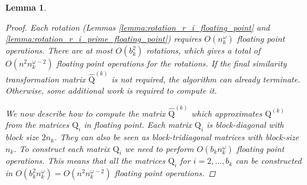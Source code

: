 \documentclass{article}
\newtheorem{lemma}{Lemma}[section]
\newcommand\matQ{\boldsymbol{\mathrm{Q}}}
\newcommand\matQhat{\widehat{\boldsymbol{\mathrm{Q}}}}
\begin{document}
\begin{lemma}
\begin{proof}
        Each rotation (Lemmas \ref{lemma:rotation_r_i_floating_point} and \ref{lemma:rotation_r_i_prime_floating_point}) requires $O(n_k^{\omega})$ floating point operations. There are at most $O(b_k^2)$ rotations, which gives a total of $O(n^2n_k^{\omega-2})$ floating point operations for the rotations. If the final similarity transformation matrix $\matQhat^{(k)}$ is not required, the algorithm can already terminate. Otherwise, some additional work is required to compute it.
        
        We now describe how to compute the matrix $\matQhat^{(k)}$ which approximates $ \matQ^{(k)}$  from the matrices $\matQ_i$ in floating point. Each matrix $\matQ_i$ is block-diagonal with block size $2n_k$. They can also be seen as block-tridiagonal matrices with block-size $n_k$. To construct each matrix $\matQ_i$ we need to perform $O(b_kn_k^{\omega})$ floating point operations. This means that all the matrices $\matQ_i$ for $i=2,\ldots,b_k$ can be constructed in $O(b_k^2n_k^{\omega})=O(n^2n_k^{\omega-2})$ floating point operations.
        

\end{proof}
\end{lemma}
\end{document}
